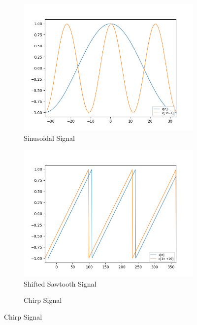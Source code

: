 \documentclass[10pt,a4paper, margin=1in]{article}
\begin{document}
\begin{figure}[h]
    \centering
    \begin{subfigure}[t]{0.3\linewidth}
        \centering
        \caption{Sinusoidal Signal}
        \includegraphics[width=1\linewidth]{assets/q7b/sine_part_b.png}
    \end{subfigure}
    \begin{subfigure}[t]{0.3\linewidth}
        \centering
        \caption{Shifted Sawtooth Signal}
        \includegraphics[width=1\linewidth]{assets/q7b/shifted_sawtooth_part_b.png}
    \end{subfigure}
    \begin{subfigure}[t]{0.3\linewidth}
        \centering
        \caption{Chirp Signal}

\end{subfigure}
\end{figure}
\end{document}
